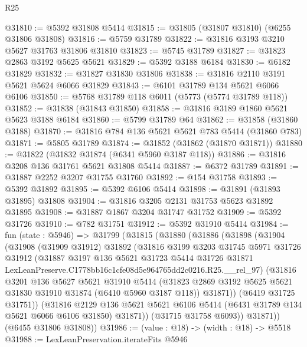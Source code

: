 \begin{lexlean}{R25}
\begin{coremodule}
@31810 := @5392 @31808 @5414
@31815 := @31805 (@31807 @31810) (@6255 @31806 @31808)
@31816 := @5759 @31789
@31822 := @31816 @3193 @3210 @5627 @31763 @31806 @31810
@31823 := @5745 @31789
@31827 := @31823 @2863 @3192 @5625 @5621
@31829 := @5392 @3188 @6184
@31830 := @6182 @31829
@31832 := @31827 @31830 @31806
@31838 := @31816 @2110 @3191 @5621 @5624 @6066 @31829
@31843 := @6101 @31789 @134 @5621 @6066 @6106
@31850 := @5768 @31789 @118 @6011 (@5773 (@5774 @31789 @118))
@31852 := @31838 (@31843 @31850)
@31858 := @31816 @3189 @1860 @5621 @5623 @3188 @6184
@31860 := @5799 @31789 @64
@31862 := @31858 (@31860 @3188)
@31870 := @31816 @784 @136 @5621 @5621 @783 @5414 (@31860 @783)
@31871 := @5805 @31789
@31874 := @31852 (@31862 (@31870 @31871))
@31880 := @31822 (@31832 @31874 (@6341 @5960 @3187 @118))
@31886 := @31816 @3208 @136 @31761 @5621 @31808 @5414
@31887 := @6372 @31789
@31891 := @31887 @2252 @3207 @31755 @31760
@31892 := @154 @31758
@31893 := @5392 @31892
@31895 := @5392 @6106 @5414
@31898 := @31891 (@31893 @31895) @31808
@31904 := @31816 @3205 @2131 @31753 @5623 @31892 @31895
@31908 := @31887 @1867 @3204 @31747 @31752
@31909 := @5392 @31726
@31910 := @782 @31751
@31912 := @5392 @31910 @5414
@31984 := fun (state : @5946) =>
  @31799
    (@31815
      (@31880
        (@31886
          (@31898
            (@31904
              (@31908
                (@31909 @31912)
                @31892
                (@31816
                  @3199
                  @3203
                  @31745
                  @5971
                  @31726
                  @31912
                  (@31887
                    @3197
                    @136
                    @5621
                    @31723
                    @5414
                    @31726
                    @31871
                    LexLeanPreserve.C1778bb16c1cfe08d5e964765dd2c0216.R25.__rel_97)
                  (@31816
                    @3201
                    @136
                    @5627
                    @5621
                    @31910
                    @5414
                    (@31823 @2869 @3192 @5625 @5621 @31830 @31910 @31874 (@6410 @5960 @3187 @118))
                    @31871))
                (@6419 @31725 @31751))
              (@31816
                @2129
                @136
                @5621
                @5621
                @6106
                @5414
                (@6431 @31789 @134 @5621 @6066 @6106 @31850)
                @31871))
            (@31715 @31758 @6093))
          @31871))
      (@6455 @31806 @31808))
@31986 := (value : @18) -> (width : @18) -> @5518
@31988 := LexLeanPreservation.iterateFits @5946

\end{coremodule}
\end{lexlean}

